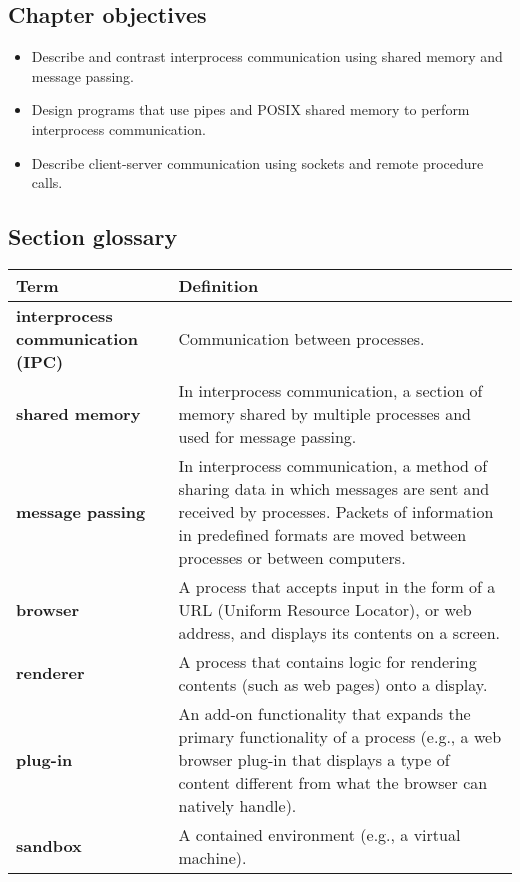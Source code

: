 \subsection*{Chapter objectives}
\begin{itemize}
    \item Describe and contrast interprocess communication using shared memory and message passing.
    \item Design programs that use pipes and POSIX shared memory to perform interprocess communication.
    \item Describe client-server communication using sockets and remote procedure calls.
\end{itemize}

\subsection*{Section glossary}
\centering
\begin{tabular}{>{\raggedright}p{} >{\raggedright\arraybackslash}p{}}
\toprule
\textbf{Term} & \textbf{Definition} \\
\midrule
\textbf{interprocess communication (IPC)} & Communication between processes. \\
\textbf{shared memory} & In interprocess communication, a section of memory shared by multiple processes and used for message passing. \\
\textbf{message passing} & In interprocess communication, a method of sharing data in which messages are sent and received by processes. Packets of information in predefined formats are moved between processes or between computers. \\
\textbf{browser} & A process that accepts input in the form of a URL (Uniform Resource Locator), or web address, and displays its contents on a screen. \\
\textbf{renderer} & A process that contains logic for rendering contents (such as web pages) onto a display. \\
\textbf{plug-in} & An add-on functionality that expands the primary functionality of a process (e.g., a web browser plug-in that displays a type of content different from what the browser can natively handle). \\
\textbf{sandbox} & A contained environment (e.g., a virtual machine). \\
\bottomrule
\end{tabular}
\vspace{\baselineskip}
